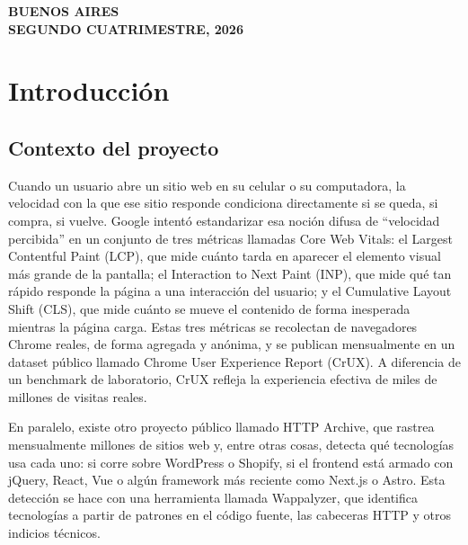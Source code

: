 \documentclass[12pt, a4paper]{article}
\begin{document}
\begin{titlepage}
    \vfill
    \vspace{0.8cm}

    \begin{center}
        {\large \textbf{BUENOS AIRES}} \\[0.2cm]
        {\large \textbf{SEGUNDO CUATRIMESTRE, 2026}}
    \end{center}
    \vspace*{0.3cm}
\end{titlepage}

\newpage
\tableofcontents
\newpage




\section{Introducción}

\subsection{Contexto del proyecto}

Cuando un usuario abre un sitio web en su celular o su computadora, la velocidad con la que ese sitio responde condiciona directamente si se queda, si compra, si vuelve. Google intentó estandarizar esa noción difusa de ``velocidad percibida'' en un conjunto de tres métricas llamadas Core Web Vitals: el Largest Contentful Paint (LCP), que mide cuánto tarda en aparecer el elemento visual más grande de la pantalla; el Interaction to Next Paint (INP), que mide qué tan rápido responde la página a una interacción del usuario; y el Cumulative Layout Shift (CLS), que mide cuánto se mueve el contenido de forma inesperada mientras la página carga. Estas tres métricas se recolectan de navegadores Chrome reales, de forma agregada y anónima, y se publican mensualmente en un dataset público llamado Chrome User Experience Report (CrUX). A diferencia de un benchmark de laboratorio, CrUX refleja la experiencia efectiva de miles de millones de visitas reales.

En paralelo, existe otro proyecto público llamado HTTP Archive, que rastrea mensualmente millones de sitios web y, entre otras cosas, detecta qué tecnologías usa cada uno: si corre sobre WordPress o Shopify, si el frontend está armado con jQuery, React, Vue o algún framework más reciente como Next.js o Astro. Esta detección se hace con una herramienta llamada Wappalyzer, que identifica tecnologías a partir de patrones en el código fuente, las cabeceras HTTP y otros indicios técnicos.
\end{document}

